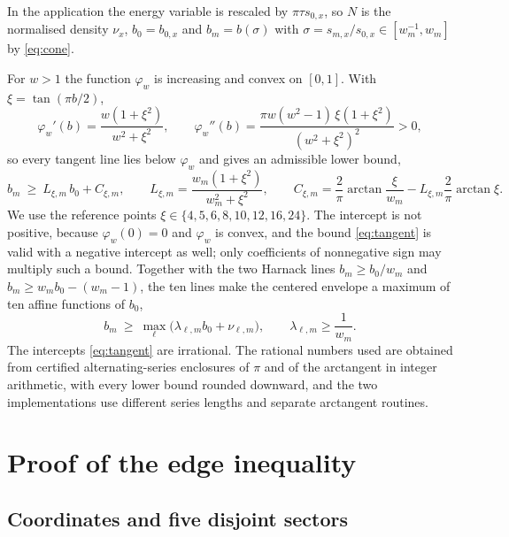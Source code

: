\documentclass[10pt]{article}
\theoremstyle{remark}
\begin{document}
In the application the energy variable is rescaled by $\pi\tau s_{0,x}$, so $N$ is the normalised density $\nu_x$, $b_0=b_{0,x}$ and $b_m=b(\sigma)$ with $\sigma=s_{m,x}/s_{0,x}\in[w_m^{-1},w_m]$ by \eqref{eq:cone}.

For $w>1$ the function $\varphi_w$ is increasing and convex on $[0,1]$. With $\xi=\tan(\pi b/2)$,
\[
\varphi_w'(b)=\frac{w(1+\xi^2)}{w^2+\xi^2},\qquad
\varphi_w''(b)=\frac{\pi w(w^2-1)\,\xi(1+\xi^2)}{(w^2+\xi^2)^2}>0 ,
\]
so every tangent line lies below $\varphi_w$ and gives an admissible lower bound,
\begin{equation}\label{eq:tangent}
b_m\ \ge\ L_{\xi,m}\,b_0+C_{\xi,m},\qquad
L_{\xi,m}=\frac{w_m(1+\xi^2)}{w_m^2+\xi^2},\qquad
C_{\xi,m}=\frac2\pi\arctan\frac{\xi}{w_m}-L_{\xi,m}\frac2\pi\arctan\xi .
\end{equation}
We use the reference points $\xi\in\{4,5,6,8,10,12,16,24\}$. The intercept is not positive, because $\varphi_w(0)=0$ and $\varphi_w$ is convex, and the bound \eqref{eq:tangent} is valid with a negative intercept as well; only coefficients of nonnegative sign may multiply such a bound. Together with the two Harnack lines $b_m\ge b_0/w_m$ and $b_m\ge w_mb_0-(w_m-1)$, the ten lines make the centered envelope a maximum of ten affine functions of $b_0$,
\begin{equation}\label{eq:env}
b_m\ \ge\ \max_{\ell}\bigl(\lambda_{\ell,m}b_0+\nu_{\ell,m}\bigr),\qquad \lambda_{\ell,m}\ge\frac1{w_m} .
\end{equation}
The intercepts \eqref{eq:tangent} are irrational. The rational numbers used are obtained from certified alternating-series enclosures of $\pi$ and of the arctangent in integer arithmetic, with every lower bound rounded downward, and the two implementations use different series lengths and separate arctangent routines.

\section{Proof of the edge inequality}\label{sec:proof}

\subsection{Coordinates and five disjoint sectors}
\end{document}

